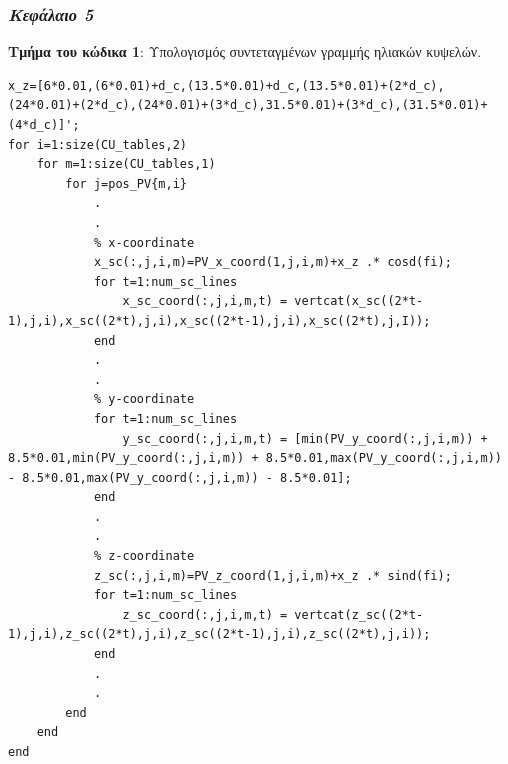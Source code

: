 \documentclass[12pt, a4paper]{report} %
\begin{document}
\subsubsection*{\textit{Κεφάλαιο 5}}\label{appx_A_5}

\noindent \textbf{Τμήμα του κώδικα 1}: Υπολογισμός συντεταγμένων γραμμής ηλιακών κυψελών.
\begin{lstlisting}
x_z=[6*0.01,(6*0.01)+d_c,(13.5*0.01)+d_c,(13.5*0.01)+(2*d_c),(24*0.01)+(2*d_c),(24*0.01)+(3*d_c),31.5*0.01)+(3*d_c),(31.5*0.01)+(4*d_c)]';
for i=1:size(CU_tables,2)
    for m=1:size(CU_tables,1)
        for j=pos_PV{m,i}
            .
            .
            % x-coordinate
            x_sc(:,j,i,m)=PV_x_coord(1,j,i,m)+x_z .* cosd(fi);
            for t=1:num_sc_lines
                x_sc_coord(:,j,i,m,t) = vertcat(x_sc((2*t-1),j,i),x_sc((2*t),j,i),x_sc((2*t-1),j,i),x_sc((2*t),j,I));
            end
            .
            .
            % y-coordinate
            for t=1:num_sc_lines
                y_sc_coord(:,j,i,m,t) = [min(PV_y_coord(:,j,i,m)) + 8.5*0.01,min(PV_y_coord(:,j,i,m)) + 8.5*0.01,max(PV_y_coord(:,j,i,m)) - 8.5*0.01,max(PV_y_coord(:,j,i,m)) - 8.5*0.01];
            end
            .
            .
            % z-coordinate
            z_sc(:,j,i,m)=PV_z_coord(1,j,i,m)+x_z .* sind(fi);
            for t=1:num_sc_lines
                z_sc_coord(:,j,i,m,t) = vertcat(z_sc((2*t-1),j,i),z_sc((2*t),j,i),z_sc((2*t-1),j,i),z_sc((2*t),j,i));
            end
            .
            .
        end
    end
end
\end{lstlisting}
\end{document}
